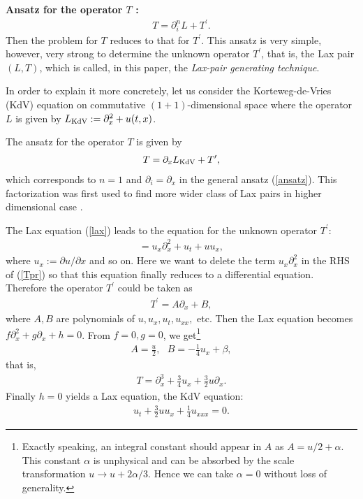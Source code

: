 \documentclass[a4paper,12pt]{article}\setlength{\topmargin}{-1cm}
\begin{document}
\vspace{3mm}
\noindent
{\bf Ansatz for the operator $T$ :}
\begin{eqnarray}
\label{ansatz}
T=\partial_i^n L+T^\prime.
\end{eqnarray}
\noindent
Then the problem for $T$ reduces to that for $T^\prime$.
This ansatz is very simple, however, very strong
to determine the unknown operator $T^\prime$, 
that is, the Lax pair $(L,T)$,
which is called, in this paper, the
{\it Lax-pair generating technique}.

In order to explain it more concretely,
let us consider the Korteweg-de-Vries (KdV) 
equation on commutative $(1+1)$-dimensional space
where the operator $L$ is given 
by $L_{\scriptsize\mbox{KdV}}:=\partial_x^2+u(t,x)$.

The ansatz for the operator $T$ is given by
\begin{eqnarray}
T=\partial_x L_{\scriptsize\mbox{KdV}} +T^\prime,
\label{ansatz_KdV}
\end{eqnarray}
which corresponds to $n=1$ and $\partial_i=\partial_x$ in
the general ansatz (\ref{ansatz}).
This factorization 
was first used to find more wider class of
Lax pairs in higher dimensional case \cite{ToYu}.

The Lax equation (\ref{lax}) leads to the equation for 
the unknown operator $T^\prime$:
\begin{eqnarray}
[\partial_x^2+u,T^\prime]=u_x\partial_x^2+u_t+uu_x,
\label{Tpr}
\end{eqnarray}
where $u_x:=\partial u/\partial x$ and so on.
Here we want to delete the term $u_x\partial_x^2$ in the RHS of (\ref{Tpr})
so that this equation
finally reduces to a differential equation.
Therefore the operator $T^\prime$ could be taken as
\begin{eqnarray}
T^\prime=A \partial_x+B,
\end{eqnarray}
where $A, B$ are polynomials of $u, u_x, u_t, u_{xx},$ etc.
Then the Lax equation becomes $f\partial_x^2+g\partial_x+h=0$.
{}From $f=0, g=0$, we get\footnote{Exactly speaking, 
an integral constant should appear in $A$ as $A=u/2+\alpha$.
This constant $\alpha$ is unphysical
and can be absorbed by the scale transformation $u\rightarrow u+2\alpha/3$. 
Hence we can take $\alpha=0$ without loss of generality.}
\begin{eqnarray}
A=\frac{u}{2},~~~B=-\frac{1}{4}u_x+\beta,
\end{eqnarray}
that is,
\begin{eqnarray}
T=\partial_x^3+\frac{3}{4}u_x+\frac{3}{2}u\partial_x.
\end{eqnarray}
Finally $h=0$ yields a Lax equation, the KdV equation:
\begin{eqnarray}
u_t+\frac{3}{2}uu_x+\frac{1}{4}u_{xxx}=0.
\end{eqnarray}
\end{document}
